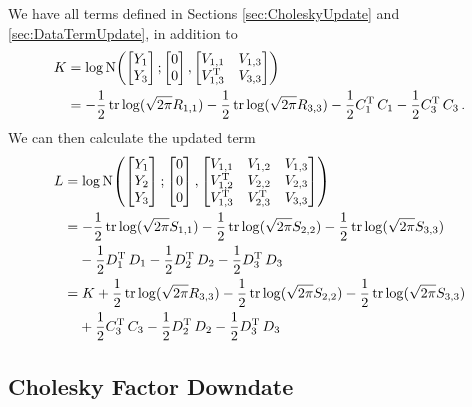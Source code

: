 \documentclass{acmtrans2m}
\begin{document}
We have all terms defined in Sections \ref{sec:CholeskyUpdate} and \ref{sec:DataTermUpdate}, in addition to 
\begin{align*}
K & = \log \text{N}\!\left(\begin{bmatrix} Y_1\\Y_3 \end{bmatrix};\begin{bmatrix}0\\0\end{bmatrix},\begin{bmatrix} V_{1,1} & V_{1,3} \\ V^{\mathrm{T}}_{1,3} & V_{3,3} \end{bmatrix}\right)\\
& = -\frac{1}{2} \operatorname{tr} \log (\sqrt{2 \pi} R_{1,1}) -\frac{1}{2} \operatorname{tr} \log (\sqrt{2 \pi} R_{3,3}) - \frac{1}{2} C_1^{\mathrm{T}}\, C_1 - \frac{1}{2} C_3^{\mathrm{T}}\, C_3\,.
\end{align*}
We can then calculate the updated term
\begin{align}
L & = \log \text{N}\!\left(\begin{bmatrix} Y_1\\Y_2\\Y_3 \end{bmatrix};\begin{bmatrix}0\\0\\0\end{bmatrix},\begin{bmatrix} V_{1,1} & V_{1,2} & V_{1,3} \\ V^{\mathrm{T}}_{1,2} & V_{2,2} & V_{2,3} \\ V^{\mathrm{T}}_{1,3} & V^{\mathrm{T}}_{2,3} & V_{3,3} \end{bmatrix}\right)
\nonumber\\
& = -\frac{1}{2} \operatorname{tr} \log (\sqrt{2 \pi} S_{1,1}) -\frac{1}{2} \operatorname{tr} \log (\sqrt{2 \pi} S_{2,2})-\frac{1}{2} \operatorname{tr} \log (\sqrt{2 \pi} S_{3,3}) 
\nonumber\\
&\phantom{=}\; - \frac{1}{2} D_1^{\mathrm{T}}\, D_1 - \frac{1}{2} D_2^{\mathrm{T}}\, D_2- \frac{1}{2} D_3^{\mathrm{T}}\, D_3
\nonumber\\
& = K + \frac{1}{2} \operatorname{tr} \log (\sqrt{2 \pi} R_{3,3}) - \frac{1}{2} \operatorname{tr} \log (\sqrt{2 \pi} S_{2,2})-\frac{1}{2} \operatorname{tr} \log (\sqrt{2 \pi} S_{3,3})
\nonumber\\
&\phantom{=}\; + \frac{1}{2} C_3^{\mathrm{T}}\, C_3 - \frac{1}{2} D_2^{\mathrm{T}}\, D_2- \frac{1}{2} D_3^{\mathrm{T}}\, D_3
\end{align}

\subsection{Cholesky Factor Downdate} \label{sec:CholeskyDowndate}
\end{document}
